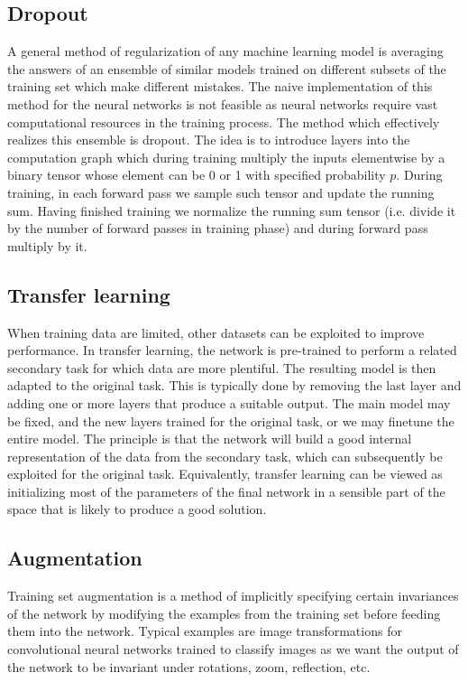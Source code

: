 \documentclass{myclass}
\begin{document}
\subsection{Dropout}

A general method of regularization of any machine learning model is averaging the answers of an
ensemble of similar models trained on different subsets of the training set which make different
mistakes. The naive implementation of this method for the neural networks is not feasible as neural
networks require vast computational resources in the training process. The method which effectively
realizes this ensemble is dropout. The idea is to introduce layers into the computation graph which
during training multiply the inputs elementwise by a binary tensor whose element can be 0 or 1 with
specified probability \(p\). During training, in each forward pass we sample such tensor and update
the running sum. Having finished training we normalize the running sum tensor (i.e. divide it by the
number of forward passes in training phase) and during forward pass multiply by it.


\subsection{Transfer learning}

When training data are limited, other datasets can be exploited to improve performance. In transfer
learning, the network is pre-trained to perform a related secondary task for which data are more
plentiful. The resulting model is then adapted to the original task. This is typically done by
removing the last layer and adding one or more layers that produce a suitable output. The main model
may be fixed, and the new layers trained for the original task, or we may finetune the entire model.
The principle is that the network will build a good internal representation of the data from the
secondary task, which can subsequently be exploited for the original task. Equivalently, transfer
learning can be viewed as initializing most of the parameters of the final network in a sensible
part of the space that is likely to produce a good solution.


\subsection{Augmentation}

Training set augmentation is a method of implicitly specifying certain invariances of the network by
modifying the examples from the training set before feeding them into the network. Typical examples
are image transformations for convolutional neural networks trained to classify images as we want
the output of the network to be invariant under rotations, zoom, reflection, etc.
\end{document}
